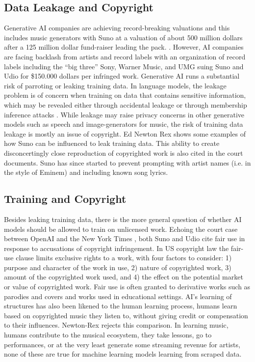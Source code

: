 \subsection{Data Leakage and Copyright}
Generative AI companies are achieving record-breaking valuations and this includes music generators with Suno at a valuation of about 500 million dollars after a 125  million dollar fund-raiser leading the pack. \cite{Stassen_2024} \cite{Tencer_2024}. However, AI companies are facing backlash from artists and record labels with an organization of record labels including the  “big three” Sony, Warner Music, and UMG suing Suno and Udio for \$150.000 dollars per infringed work\cite{Kaba_River_Perry_2024}.  Generative AI runs a substantial risk of parroting or leaking training data. In language models, the leakage problem is of concern when training on data that contains sensitive information, which may be revealed either through accidental leakage or through membership inference attacks \cite{Duan_Suri_Mireshghallah_Min_Shi_Zettlemoyer_Tsvetkov_Choi_Evans_Hajishirzi_2024}. While leakage may raise privacy concerns in other generative models such as speech and image-generators \cite{Carlini_Hayes_Nasr_Jagielski_Sehwag_Tramèr_Balle_Ippolito_Wallace_2023} for music, the risk of training data leakage is mostly an issue of copyright. Ed Newton Rex shows some examples of how Suno can be influenced \cite{Newton-Rex_2024} to leak training data. This ability to create disconcertingly close reproduction of copyrighted work is also cited in the court documents. Suno has since started to prevent prompting with artist names (i.e. in the style of Eminem) and including known song lyrics. 

\subsection{Training and Copyright}
Besides leaking training data, there is the more general question of whether AI models should be allowed to train on unlicensed work. Echoing the court case between OpenAI and the New York Times \cite{Reed_2024}, both Suno and Udio cite fair use in response to accusations of copyright infringement. In US copyright law the fair-use clause limits exclusive rights to a work, with four factors to consider: 1) purpose and character of the work in use, 2) nature of copyrighted work, 3) amount of the copyrighted work used, and 4) the effect on the potential market or value of copyrighted work.\cite{copyrightlaw}   Fair use is often granted to derivative works such as parodies and covers and works used in educational settings. AI’s learning of structures has also been likened to the human learning process, humans learn based on copyrighted music they listen to, without giving credit or compensation to their influences. Newton-Rex \cite{Newton-Rex_2024} rejects this comparison. In learning music, humans contribute to the musical ecosystem, they take lessons, go to performances, or at the very least generate some streaming revenue for artists, none of these are true for machine learning models learning from scraped data. 

